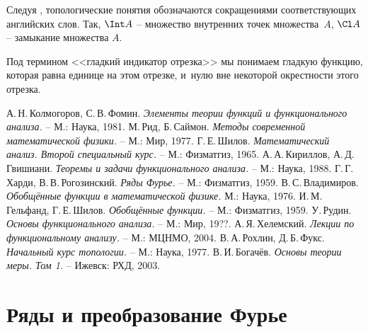 \documentclass[a4paper]{article}
\begin{document}
\begin{points}{-3}
\item Следуя \cite{rokhlin}, топологические понятия обозначаются сокращениями соответствующих английских слов.
      Так, $\Int A$ -- множество внутренних точек множества~$A$, $\Cl A$ -- замыкание множества $A$.
\item Под термином <<гладкий индикатор отрезка>> мы понимаем гладкую функцию, которая равна единице на этом отрезке,
и~нулю вне некоторой окрестности этого отрезка.
\end{points}

\begin{thebibliography}{ГШ}
\setlength\itemsep{-2pt}
    А.\,Н.\,Колмогоров, С.\,В.\,Фомин. \emph{Элементы теории функций и функционального анализа.} -- М.: Наука, 1981.
    М.\,Рид, Б.\,Саймон. \emph{Методы современной математической физики.} -- М.: Мир, 1977.
    Г.\,Е.\,Шилов. \emph{Математический анализ. Второй специальный курс.} -- М.: Физматгиз, 1965.
    А.\,А.\,Кириллов, А.\,Д.\,Гвишиани. \emph{Теоремы и задачи функционального анализа.} -- М.: Наука, 1988.
    Г.\,Г.\,Харди, В.\,В.\,Рогозинский. \emph{Ряды Фурье.} -- М.: Физматгиз, 1959.
    В.\,С.\,Владимиров. \emph{Обобщённые функции в математической физике.} М.: Наука, 1976.
    И.\,М.\,Гельфанд, Г.\,Е.\,Шилов. \emph{Обобщённые функции.} -- М.: Физматгиз, 1959.
    У.\,Рудин. \emph{Основы функционального анализа.} -- М.: Мир, 19??.
    А.\,Я.\,Хелемский. \emph{Лекции по функциональному анализу.} -- М.: МЦНМО, 2004.
    В.\,А.\,Рохлин, Д.\,Б.\,Фукс. \emph{Начальный курс топологии.} -- М.: Наука, 1977.
    В.\,И.\,Богачёв. \emph{Основы теории меры. Том 1.} -- Ижевск: РХД, 2003.
\end{thebibliography}

\medskip\dmvntrail

\pagebreak
\pagestyle{headings}

\makeatletter
  \renewcommand{\headheight}{11mm}
  \renewcommand{\headsep}{2mm}
  \renewcommand{\sectionmark}[1]{}
  \renewcommand{\subsectionmark}[1]{}
  \renewcommand{\subsubsectionmark}[1]{\markright{\thesubsubsection. #1}}
  \renewcommand{\@oddhead}{\vbox{\hbox to \textwidth{\scriptsize\thepage\hfil\rightmark\strut}\hrule}}
  \renewcommand{\@oddfoot}{\hfil\thepage\hfil}
\makeatother

\section{Ряды и преобразование Фурье}
\end{document}
